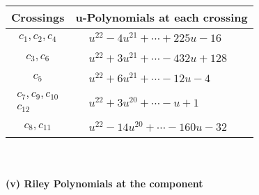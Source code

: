 \documentclass[1p]{elsarticle_modified}
\theoremstyle{definition}
\begin{document}
\begin{tabular}{m{50pt}|m{274pt}}
Crossings & \hspace{64pt}u-Polynomials at each crossing \\
\hline $$\begin{aligned}c_{1},c_{2},c_{4}\end{aligned}$$&$\begin{aligned}
&u^{22}-4 u^{21}+\cdots+225 u-16
\end{aligned}$\\
\hline $$\begin{aligned}c_{3},c_{6}\end{aligned}$$&$\begin{aligned}
&u^{22}+3 u^{21}+\cdots-432 u+128
\end{aligned}$\\
\hline $$\begin{aligned}c_{5}\end{aligned}$$&$\begin{aligned}
&u^{22}+6 u^{21}+\cdots-12 u-4
\end{aligned}$\\
\hline $$\begin{aligned}c_{7},c_{9},c_{10}\\c_{12}\end{aligned}$$&$\begin{aligned}
&u^{22}+3 u^{20}+\cdots- u+1
\end{aligned}$\\
\hline $$\begin{aligned}c_{8},c_{11}\end{aligned}$$&$\begin{aligned}
&u^{22}-14 u^{20}+\cdots-160 u-32
\end{aligned}$\\
\hline
\end{tabular}\\~\\
\newpage\renewcommand{\arraystretch}{1}
\flushleft \textbf{(v) Riley Polynomials at the component}\newline \\
\end{document}
